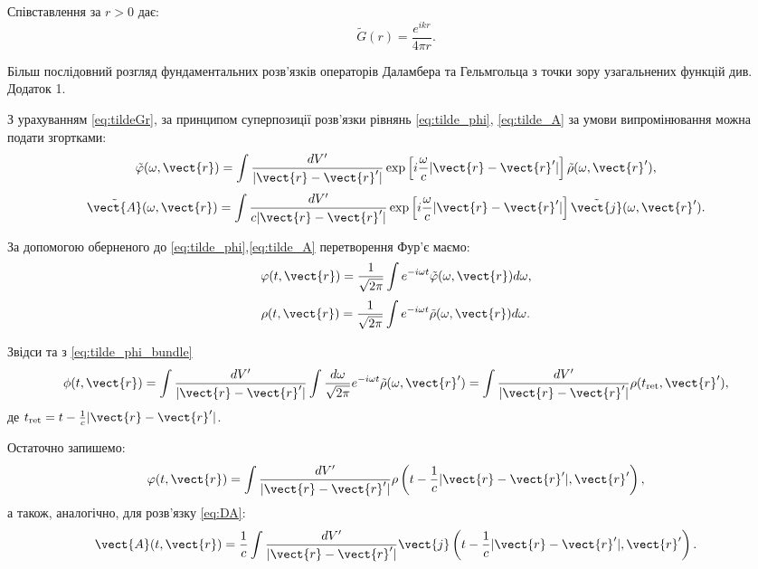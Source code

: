 Співставлення за $r > 0$ дає:
\begin{equation}\label{eq:tildeGr}
	\tilde{G}(r) = \frac{e^{ikr}}{4\pi r}.
\end{equation}

Більш послідовний розгляд фундаментальних розв’язків операторів Даламбера та Гельмгольца з точки зору узагальнених функцій див. Додаток 1.

З урахуванням \eqref{eq:tildeGr}, за принципом суперпозиції розв’язки рівнянь \eqref{eq:tilde_phi}, \eqref{eq:tilde_A} за умови випромінювання можна
подати згортками:
\begin{equation}\label{eq:tilde_phi_bundle}
	\tilde{\varphi} (\omega, \vect{r}) = \int \frac{dV'}{|\vect{r} - \vect{r}'|} \exp \left[ i \frac{\omega}{c} |\vect{r} - \vect{r}'| \right]
	\tilde{\rho} (\omega, \vect{r}'),
\end{equation}
\begin{equation}\label{eq:tilde_A_bundle}
	\tilde{\vect{A}}(\omega, \vect{r}) = \int \frac{dV'}{c|\vect{r} - \vect{r}'|} \exp \left[ i \frac{\omega}{c} |\vect{r} - \vect{r}'| \right]
	\tilde{\vect{j}} (\omega, \vect{r}').
\end{equation}

За допомогою оберненого до \eqref{eq:tilde_phi},\eqref{eq:tilde_A} перетворення Фур'є маємо:
\begin{equation}
	\varphi (t, \vect{r}) = \frac{1}{\sqrt{2\pi}} \int e^{-i\omega t} \tilde{\varphi} (\omega, \vect{r}) d\omega,
\end{equation}
\begin{equation}
	\rho (t, \vect{r}) = \frac{1}{\sqrt{2\pi}} \int e^{-i\omega t} \tilde{\rho} (\omega, \vect{r}) d\omega.
\end{equation}

Звідси та з \eqref{eq:tilde_phi_bundle}
\begin{equation}
	\phi (t, \vect{r}) = \int \frac{dV'}{|\vect{r} - \vect{r}'|} \int \frac{d\omega}{\sqrt{2\pi}} e^{-i\omega t} \tilde{\rho} (\omega, \vect{r}')
	= \int \frac{dV'}{|\vect{r} - \vect{r}'|} \rho (t_{\text{ret}}, \vect{r}'),
\end{equation}
де $t_{\text{ret}} = t - \frac{1}{c} |\vect{r} - \vect{r}'|$.

Остаточно запишемо:
\begin{equation}\label{eq:phi_ret}
	\varphi (t, \vect{r}) = \int \frac{dV'}{|\vect{r} - \vect{r}'|} \rho \left( t - \frac{1}{c} |\vect{r} - \vect{r}'|, \vect{r}' \right),
\end{equation}
а також, аналогічно, для розв’язку \eqref{eq:DA}:
\begin{equation}\label{eq:A_ret}
	\vect{A} (t, \vect{r}) = \frac{1}{c} \int \frac{dV'}{|\vect{r} - \vect{r}'|} \vect{j} \left( t - \frac{1}{c} |\vect{r} - \vect{r}'|,
	\vect{r}' \right).
\end{equation}

